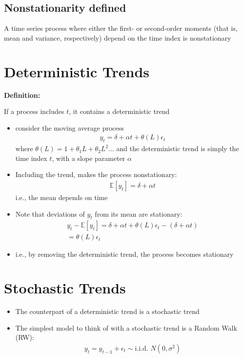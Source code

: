 \documentclass[10pt]{article}
\begin{document}
\subsection{Nonstationarity defined}
A time series process where either the first- or second-order moments (that is, mean and variance, respectively) depend on the time index is nonstationary
\section{Deterministic Trends}
\textbf{Definition:}

If a process includes $t $, it contains a deterministic trend 
\begin{itemize}
    \item consider the moving average process 
    \begin{gather*}
        y_t = \delta + \alpha t + \theta(L)\epsilon_t
    \end{gather*}
    where $\theta(L) = 1 + \theta_1L + \theta_2L^2 \dots $ and the deterministic trend is simply the time index $t $, with a slope parameter $\alpha $
    \item Including the trend, makes the process nonstationary:
    \begin{gather*}
        \mathbb{E}[y_t] = \delta + \alpha t
    \end{gather*}
    i.e., the mean depends on time 
    \item Note that deviations of $y_t $ from its mean are stationary:
    \begin{gather*}
        y_t - \mathbb{E}[y_t] = \delta + \alpha t + \theta(L)\epsilon_t - (\delta + \alpha t)\\
        = \theta(L)\epsilon_t
    \end{gather*}
    \item i.e., by removing the deterministic trend, the process becomes stationary
\end{itemize}
\newpage 
\section{Stochastic Trends}
\begin{itemize}
    \item The counterpart of a deterministic trend is a stochastic trend 
    \item The simplest model to think of with a stochastic trend is a Random Walk (RW): 
    \begin{gather*}
        y_t = y_{t - 1} + \epsilon_t \sim \text{i.i.d. }N(0, \sigma^2)
    \end{gather*}
\end{itemize}
\end{document}
